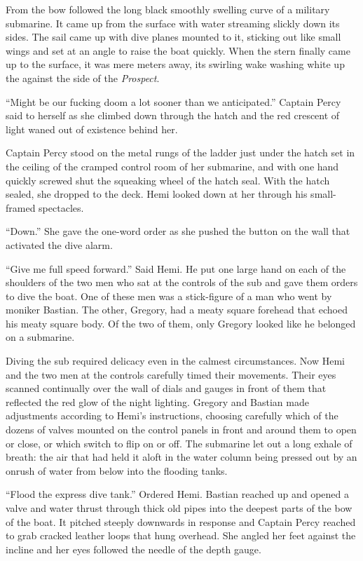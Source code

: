 \documentclass[]{article}
\begin{document}
\begin{multicols}{2}
From the bow followed the long black smoothly swelling curve of a
military submarine. It came up from the surface with water streaming
slickly down its sides. The sail came up with dive planes mounted to it,
sticking out like small wings and set at an angle to raise the boat
quickly. When the stern finally came up to the surface, it was mere
meters away, its swirling wake washing white up the against the side of
the \emph{Prospect}.

``Might be our fucking doom a lot sooner than we anticipated.'' Captain
Percy said to herself as she climbed down through the hatch and the red
crescent of light waned out of existence behind her.

Captain Percy stood on the metal rungs of the ladder just under the
hatch set in the ceiling of the cramped control room of her submarine,
and with one hand quickly screwed shut the squeaking wheel of the hatch
seal. With the hatch sealed, she dropped to the deck. Hemi looked down
at her through his small-framed spectacles.

``Down.'' She gave the one-word order as she pushed the button on the
wall that activated the dive alarm.

``Give me full speed forward.'' Said Hemi. He put one large hand on each
of the shoulders of the two men who sat at the controls of the sub and
gave them orders to dive the boat. One of these men was a stick-figure
of a man who went by moniker Bastian. The other, Gregory, had a meaty
square forehead that echoed his meaty square body. Of the two of them,
only Gregory looked like he belonged on a submarine.

Diving the sub required delicacy even in the calmest circumstances. Now
Hemi and the two men at the controls carefully timed their movements.
Their eyes scanned continually over the wall of dials and gauges in
front of them that reflected the red glow of the night lighting. Gregory
and Bastian made adjustments according to Hemi's instructions, choosing
carefully which of the dozens of valves mounted on the control panels in
front and around them to open or close, or which switch to flip on or
off. The submarine let out a long exhale of breath: the air that had
held it aloft in the water column being pressed out by an onrush of
water from below into the flooding tanks.

``Flood the express dive tank.'' Ordered Hemi. Bastian reached up and
opened a valve and water thrust through thick old pipes into the deepest
parts of the bow of the boat. It pitched steeply downwards in response
and Captain Percy reached to grab cracked leather loops that hung
overhead. She angled her feet against the incline and her eyes followed
the needle of the depth gauge.


\end{multicols}
\end{document}
